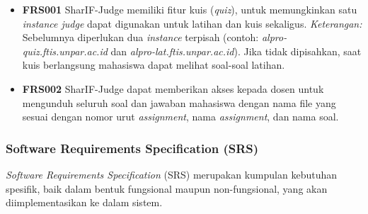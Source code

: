 \begin{itemize}
    \item \textbf{FRS001} SharIF-Judge memiliki fitur kuis (\textit{quiz}), untuk memungkinkan satu \textit{instance judge} dapat digunakan untuk latihan dan kuis sekaligus. \textit{Keterangan:} Sebelumnya diperlukan dua \textit{instance} terpisah (contoh: \textit{alpro-quiz.ftis.unpar.ac.id} dan \textit{alpro-lat.ftis.unpar.ac.id}). Jika tidak dipisahkan, saat kuis berlangsung mahasiswa dapat melihat soal-soal latihan.
    
    \item \textbf{FRS002} SharIF-Judge dapat memberikan akses kepada dosen untuk mengunduh seluruh soal dan jawaban mahasiswa dengan nama file yang sesuai dengan nomor urut \textit{assignment}, nama \textit{assignment}, dan nama soal. 
\end{itemize}


\subsubsection{Software Requirements Specification (SRS)}
\textit{Software Requirements Specification} (SRS) merupakan kumpulan kebutuhan spesifik, baik dalam bentuk fungsional maupun non-fungsional, yang akan diimplementasikan ke dalam sistem.

